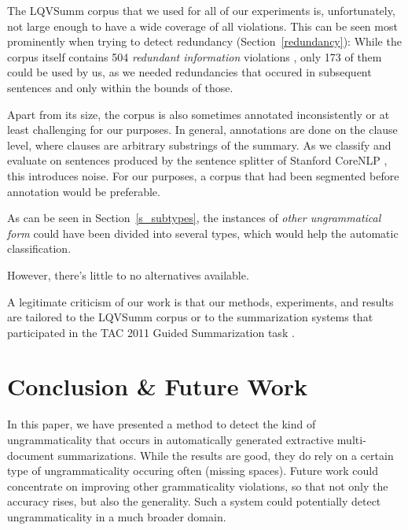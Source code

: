 \documentclass[a4paper,10pt]{scrartcl}
\theoremstyle{style}
\begin{document}
The LQVSumm corpus that we used for all of our experiments is, unfortunately, not large enough to have a wide coverage of all violations. This can be seen most prominently when trying to detect redundancy (Section~\ref{redundancy}): While the corpus itself contains 504 \textit{redundant information} violations \citep[see][]{friedrichlqvsumm}, only 173 of them could be used by us, as we needed redundancies that occured in subsequent sentences and only within the bounds of those.

Apart from its size, the corpus is also sometimes annotated inconsistently or at least challenging for our purposes. In general, annotations are done on the clause level, where clauses are arbitrary substrings of the summary. As we classify and evaluate on sentences produced by the sentence splitter of Stanford CoreNLP \citep{manning-EtAl:2014:P14-5}, this introduces noise. For our purposes, a corpus that had been segmented before annotation would be preferable.

As can be seen in Section~\ref{s_subtypes}, the instances of \textit{other ungrammatical form} could have been divided into several types, which would help the automatic classification.

However, there's little to no alternatives available.

A legitimate criticism of our work is that our methods, experiments, and results are tailored to the LQVSumm corpus or to the summarization systems that participated in the TAC 2011 Guided Summarization task \citep{owczarzak2011overview}.



\section{Conclusion \& Future Work}
\label{conclusion}

In this paper, we have presented a method to detect the kind of ungrammaticality that occurs in automatically generated extractive multi-document summarizations. While the results are good, they do rely on a certain type of ungrammaticality occuring often (missing spaces). Future work could concentrate on improving other grammaticality violations, so that not only the accuracy rises, but also the generality. Such a system could potentially detect ungrammaticality in a much broader domain.
\end{document}
